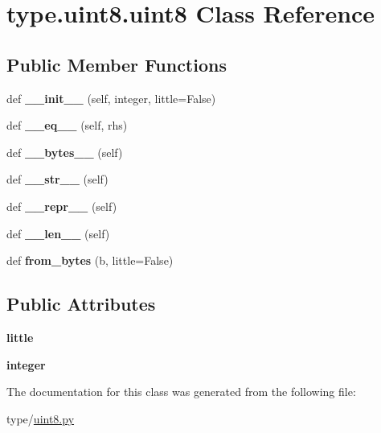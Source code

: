 \hypertarget{classtype_1_1uint8_1_1uint8}{}\section{type.\+uint8.\+uint8 Class Reference}
\label{classtype_1_1uint8_1_1uint8}
\subsection*{Public Member Functions}
\begin{DoxyCompactItemize}
\item 
\mbox{\label{classtype_1_1uint8_1_1uint8_a9ac226b246d39b4fdb8e44512d8c0554}} 
def {\bfseries \+\_\+\+\_\+init\+\_\+\+\_\+} (self, integer, little=False)
\item 
\mbox{\label{classtype_1_1uint8_1_1uint8_a9b6694eb9603f3e20afcde386cd669f9}} 
def {\bfseries \+\_\+\+\_\+eq\+\_\+\+\_\+} (self, rhs)
\item 
\mbox{\label{classtype_1_1uint8_1_1uint8_a613b7bed06cc501d9c504eee82c1f82a}} 
def {\bfseries \+\_\+\+\_\+bytes\+\_\+\+\_\+} (self)
\item 
\mbox{\label{classtype_1_1uint8_1_1uint8_a1b174495d0783fabd48d8b7d52aef2d0}} 
def {\bfseries \+\_\+\+\_\+str\+\_\+\+\_\+} (self)
\item 
\mbox{\label{classtype_1_1uint8_1_1uint8_a31cfea23d28318bbf7cac0d198f37691}} 
def {\bfseries \+\_\+\+\_\+repr\+\_\+\+\_\+} (self)
\item 
\mbox{\label{classtype_1_1uint8_1_1uint8_a08a948588e7e41484abb1db73e19680c}} 
def {\bfseries \+\_\+\+\_\+len\+\_\+\+\_\+} (self)
\item 
\mbox{\label{classtype_1_1uint8_1_1uint8_ae32852c0236601b1671f63f7cacd830f}} 
def {\bfseries from\+\_\+bytes} (b, little=False)
\end{DoxyCompactItemize}
\subsection*{Public Attributes}
\begin{DoxyCompactItemize}
\item 
\mbox{\label{classtype_1_1uint8_1_1uint8_a2b1dc2c684de0e499e25ece70ba749e5}} 
{\bfseries little}
\item 
\mbox{\label{classtype_1_1uint8_1_1uint8_adee10d659cae40cf903b3e899019e2da}} 
{\bfseries integer}
\end{DoxyCompactItemize}


The documentation for this class was generated from the following file\+:\begin{DoxyCompactItemize}
\item 
type/\mbox{\hyperlink{uint8_8py}{uint8.\+py}}\end{DoxyCompactItemize}
